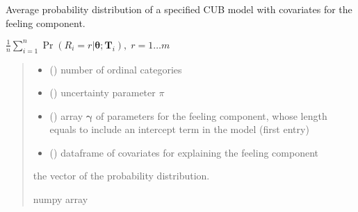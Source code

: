\documentclass[letterpaper,10pt,english]{sphinxmanual}
\begin{document}
\begin{fulllineitems}
\label{\detokenize{cubmods:cubmods.cub_0w.pmf}}
\pysigstartsignatures
{}
\pysigstopsignatures
\sphinxAtStartPar
Average probability distribution of a specified CUB model 
with covariates for the feeling component.

\sphinxAtStartPar
\(\frac{1}{n} \sum_{i=1}^n \Pr(R_i=r|\pmb\theta; \pmb T_i),\; r=1 \ldots m\)
\begin{quote}\begin{description}
\begin{itemize}
\item {} 
\sphinxAtStartPar
{} () \textendash{} number of ordinal categories

\item {} 
\sphinxAtStartPar
{} () \textendash{} uncertainty parameter \(\pi\)

\item {} 
\sphinxAtStartPar
{} () \textendash{} array \(\pmb \gamma\) of parameters for the feeling component, whose length equals 
 to include an intercept term in the model (first entry)

\item {} 
\sphinxAtStartPar
{} () \textendash{} dataframe of covariates for explaining the feeling component

\end{itemize}

\sphinxAtStartPar
the vector of the probability distribution.

\sphinxAtStartPar
numpy array

\end{description}\end{quote}

\end{fulllineitems}
\end{document}
